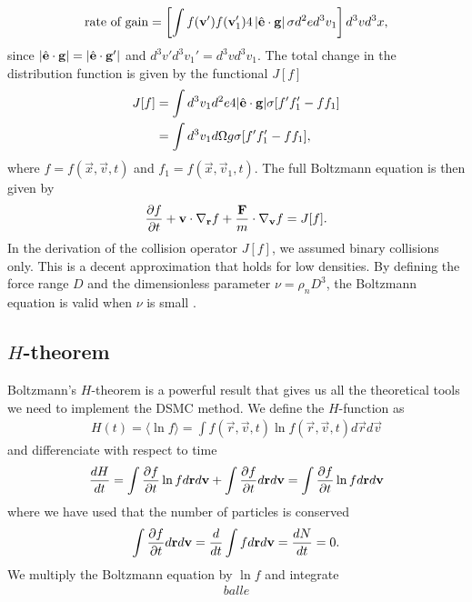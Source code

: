 \begin{align}
	\text{rate of gain} = \left[\int f(\mathbf v')f(\mathbf v_1')4\left|\hat {\mathbf{e}} \cdot \mathbf g \right|\sigma d^2 ed^3 v_1\right]d^3 vd^3 x,
\end{align}
since $|\hat {\mathbf{e}}\cdot \mathbf g| = |\hat {\mathbf{e}}\cdot \mathbf g'|$ and $d^3 v'd^3 v_1' = d^3 vd^3 v_1$. The total change in the distribution function is given by the functional $J[f]$
\begin{align}
	J[f] &= \int d^3 v_1 d^2 e4|\hat {\mathbf{e}}\cdot\mathbf g|\sigma[f'f_1' - ff_1]\\
	&= \int d^3 v_1 d\Omega g \sigma[f'f_1' - ff_1],
\end{align}
where $f = f(\vec x, \vec v, t)$ and $f_1 = f(\vec x, \vec v_1, t)$. The full Boltzmann equation is then given by
\begin{align}
	\label{eq:boltzmann_equation}
	\frac{\partial f}{\partial t} + \mathbf v\cdot \nabla_\mathbf r f + {\mathbf F\over m}\cdot\nabla_\mathbf v f = J[f].
\end{align}
In the derivation of the collision operator $J[f]$, we assumed binary collisions only. This is a decent approximation that holds for low densities. By defining the force range $D$ and the dimensionless parameter $\nu = \rho_n D^3$, the Boltzmann equation is valid when $\nu$ is small \cite{mclennan1989introduction}. 
\subsection{$H$-theorem}
Boltzmann's $H$-theorem is a powerful result that gives us all the theoretical tools we need to implement the DSMC method. We define the $H$-function as
\begin{align}
	H(t) = \langle \ln f \rangle = \int f(\vec r, \vec v, t)\ln f(\vec r, \vec v, t)d\vec r d\vec v
\end{align}
and differenciate with respect to time
\begin{align}
	\frac{dH}{dt} = \int \frac{\partial f}{\partial t}\ln f d\mathbf r d\mathbf v + \int \frac{\partial f}{\partial t} d\mathbf r d\mathbf v = \int \frac{\partial f}{\partial t}\ln f d\mathbf r d\mathbf v
\end{align}
where we have used that the number of particles is conserved
\begin{align}
	\int \frac{\partial f}{\partial t}d\mathbf r d\mathbf v = \frac{d}{dt} \int fd\mathbf r d\mathbf v = \frac{dN}{dt} = 0.
\end{align}
We multiply the Boltzmann equation by $\ln f$ and integrate
\begin{align}
	balle
\end{align}

